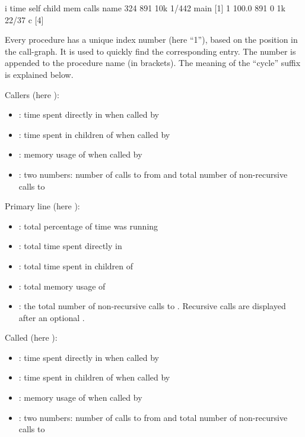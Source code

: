 \begin{example}
 i    time self  child  mem    calls   name
            324    891  10k    1/442      main [1]
 1  100.0%
            891      0   1k    22/37      c [4]
\end{example}

Every procedure has a unique index number  (here ``1''), based on the position in the
call-graph. It is used to quickly find the corresponding entry. The number is appended to
the procedure name (in brackets).
The meaning of the ``cycle'' suffix is explained below.

Callers (here ):
\begin{itemize}
	\item {}:
		time spent directly in  when called by 
	\item {}:
		time spent in children of  when called by 
	\item {}:
		memory usage of  when called by 
	\item {}:
		two numbers:
		number of calls to  from 
		and
		total number of non-recursive calls to 
\end{itemize}

Primary line (here ):
\begin{itemize}
	\item {}:
		total percentage of time  was running
	\item {}:
		total time spent directly in 
	\item {}:
		total time spent in children of 
	\item {}:
		total memory usage of 
	\item {}:
		the total number of non-recursive calls to . Recursive calls are
		displayed after an optional \code{+}.
\end{itemize}

Called (here ):
\begin{itemize}
	\item {}:
		time spent directly in  when called by 
	\item {}:
		time spent in children of  when called by 
	\item {}:
		memory usage of  when called by 
	\item {}:
		two numbers:
		number of calls to  from 
		and
		total number of non-recursive calls to 
\end{itemize}

